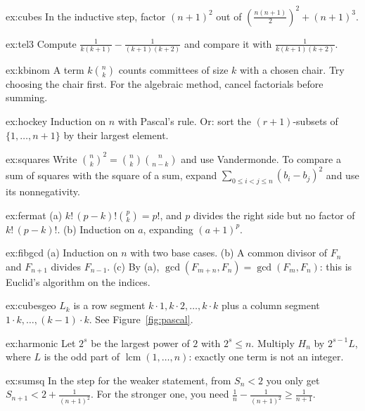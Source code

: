\begin{hint}{ex:cubes}
In the inductive step, factor $(n+1)^2$ out of $\left(\frac{n(n+1)}2\right)^2+(n+1)^3$.
\end{hint}
\begin{hint}{ex:tel3}
Compute $\frac1{k(k+1)}-\frac1{(k+1)(k+2)}$ and compare it with $\frac1{k(k+1)(k+2)}$.
\end{hint}
\begin{hint}{ex:kbinom}
A term $k\binom nk$ counts committees of size $k$ with a chosen chair. Try choosing the chair first. For the algebraic method, cancel factorials before summing.
\end{hint}
\begin{hint}{ex:hockey}
Induction on $n$ with Pascal's rule. Or: sort the $(r+1)$-subsets of $\{1,\dots,n+1\}$ by their largest element.
\end{hint}
\begin{hint}{ex:squares}
Write $\binom nk^2=\binom nk\binom n{n-k}$ and use Vandermonde. To compare a sum of squares with the square of a sum, expand $\sum_{0\le i<j\le n}(b_i-b_j)^2$ and use its nonnegativity.
\end{hint}
\begin{hint}{ex:fermat}
(a) $k!\,(p-k)!\binom pk=p!$, and $p$ divides the right side but no factor of $k!\,(p-k)!$. (b) Induction on $a$, expanding $(a+1)^p$.
\end{hint}
\begin{hint}{ex:fibgcd}
(a) Induction on $n$ with two base cases. (b) A common divisor of $F_n$ and $F_{n+1}$ divides $F_{n-1}$. (c) By (a), $\gcd(F_{m+n},F_n)=\gcd(F_m,F_n)$: this is Euclid's algorithm on the indices.
\end{hint}
\begin{hint}{ex:cubesgeo}
$L_k$ is a row segment $k\cdot1,k\cdot2,\dots,k\cdot k$ plus a column segment $1\cdot k,\dots,(k-1)\cdot k$. See Figure~\ref{fig:pascal}.
\end{hint}
\begin{hint}{ex:harmonic}
Let $2^s$ be the largest power of $2$ with $2^s\le n$. Multiply $H_n$ by $2^{s-1}L$, where $L$ is the odd part of $\operatorname{lcm}(1,\dots,n)$: exactly one term is not an integer.
\end{hint}
\begin{hint}{ex:sumsq}
In the step for the weaker statement, from $S_n<2$ you only get $S_{n+1}<2+\frac1{(n+1)^2}$. For the stronger one, you need $\frac1n-\frac1{(n+1)^2}\ge\frac1{n+1}$.
\end{hint}
